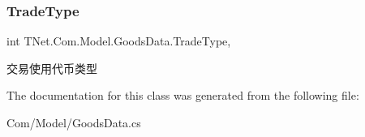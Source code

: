 \subsubsection{\texorpdfstring{Trade\+Type}{TradeType}}
{\footnotesize\ttfamily int T\+Net.\+Com.\+Model.\+Goods\+Data.\+Trade\+Type\hspace{0.3cm}{\ttfamily [get]}, {\ttfamily [set]}}



交易使用代币类型 



The documentation for this class was generated from the following file\+:\begin{DoxyCompactItemize}
\item 
Com/\+Model/Goods\+Data.\+cs\end{DoxyCompactItemize}
